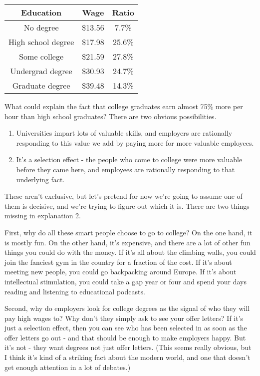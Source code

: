 \documentclass[11pt,]{article}
\providecommand{\tightlist}{%
  \setlength{\itemsep}{0pt}\setlength{\parskip}{0pt}}
\begin{document}
\begin{longtable}[]{@{}ccc@{}}
\toprule
Education & Wage & Ratio\tabularnewline
\midrule
\endhead
No degree & \$13.56 & 7.7\%\tabularnewline
High school degree & \$17.98 & 25.6\%\tabularnewline
Some college & \$21.59 & 27.8\%\tabularnewline
Undergrad degree & \$30.93 & 24.7\%\tabularnewline
Graduate degree & \$39.48 & 14.3\%\tabularnewline
\bottomrule
\end{longtable}

What could explain the fact that college graduates earn almost 75\% more
per hour than high school graduates? There are two obvious
possibilities.

\begin{enumerate}
\def\labelenumi{\arabic{enumi}.}
\tightlist
\item
  Universities impart lots of valuable skills, and employers are
  rationally responding to this value we add by paying more for more
  valuable employees.
\item
  It's a selection effect - the people who come to college were more
  valuable before they came here, and employees are rationally
  responding to that underlying fact.
\end{enumerate}

These aren't exclusive, but let's pretend for now we're going to assume
one of them is decisive, and we're trying to figure out which it is.
There are two things missing in explanation 2.

First, why do all these smart people choose to go to college? On the one
hand, it is mostly fun. On the other hand, it's expensive, and there are
a lot of other fun things you could do with the money. If it's all about
the climbing walls, you could join the fanciest gym in the country for a
fraction of the cost. If it's about meeting new people, you could go
backpacking around Europe. If it's about intellectual stimulation, you
could take a gap year or four and spend your days reading and listening
to educational podcasts.

Second, why do employers look for college degrees as the signal of who
they will pay high wages to? Why don't they simply ask to see your offer
letters? If it's just a selection effect, then you can see who has been
selected in as soon as the offer letters go out - and that should be
enough to make employers happy. But it's not - they want degrees not
just offer letters. (This seems really obvious, but I think it's kind of
a striking fact about the modern world, and one that doesn't get enough
attention in a lot of debates.)
\end{document}

